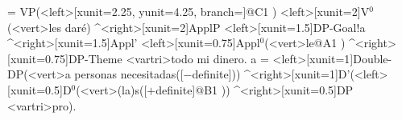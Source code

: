 \begin{exe}
	\ex
	\jtree[xunit=2,labelgap=0.2]
	\! = {VP}(<left>[xunit=2.25, yunit=4.25, branch=\blank]{}@C1 )
	<left>[xunit=2]{V$^{0}$}(<vert>{les dar\'{e}}) 
	^<right>[xunit=2]{ApplP}
	<left>[xunit=1.5]{DP-Goal}!a
	^<right>[xunit=1.5]{Appl'}
	<left>[xunit=0.75]{Appl$^{0}$}(<vert>{le}@A1 )
	^<right>[xunit=0.75]{DP-Theme} <vartri>{todo mi dinero}.
	\!a = <left>[xunit=1]{Double-DP}(<vert>{a personas necesitadas}({[$-$definite]})) 
	^<right>[xunit=1]{D'}(<left>[xunit=0.5]{D$^{0}$}(<vert>{(la)s}({[$+$definite]}@B1 )) ^<right>[xunit=0.5]{DP} <vartri>{pro}).
	\endjtree
\end{exe}
